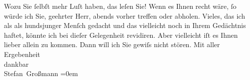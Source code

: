 \begin{ledgroupsized}[t]{13cm}
           \pstart
           Wozu Sie ſelbſt mehr Luſt haben, das leſen Sie!\pend
           \pstart
           Wenn es Ihnen recht wäre, ſo würde ich Sie, geehrter Herr, abends vorher treffen oder
               abholen.\pend
           \pstart
           Vieles, das ich als als hundsjunger Menſch gedacht und das vielleicht noch in Ihrem
                  {\pb}Gedächtnis haftet,
               könnte ich bei dieſer Gelegenheit revidiren. Aber vielleicht iſt es Ihnen lieber
               allein zu kommen. Dann will ich Sie gewiſs nicht stören.\pend
           \pstart
           Mit aller Ergebenheit{\\[\baselineskip]}dankbar{\\[\baselineskip]}\spacefill\mbox{Stefan Großmann}\pend
           \leftskip=0em{}\endnumbering{}\end{ledgroupsized}  \newcommand{\dateiname}{L01722}\newcommand{\titel}{Stefan Großmann an Arthur Schnitzler, 12. 10. 1907}\newcommand{\editorInnen}{ Martin Anton Müller und Gerd-Hermann Susen}
      